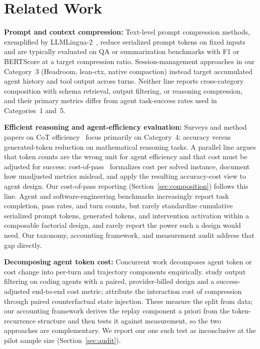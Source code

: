 \documentclass{article}
\begin{document}
\section{Related Work}
\label{sec:related}

\textbf{Prompt and context compression:} Text-level prompt compression methods, exemplified by LLMLingua-2~\citep{llmlingua2}, reduce serialized prompt tokens on fixed inputs and are typically evaluated on QA or summarization benchmarks with F1 or BERTScore at a target compression ratio. Session-management approaches in our Category~3 (Headroom, lean-ctx, native compaction) instead target accumulated agent history and tool output across turns. Neither line reports cross-category composition with schema retrieval, output filtering, or reasoning compression, and their primary metrics differ from agent task-success rates used in Categories~1 and~5.

\textbf{Efficient reasoning and agent-efficiency evaluation:} Surveys and method papers on CoT efficiency~\citep{sui2025survey, tokenskip2025, chainofdraft2025, ctrlcot2026, extracot2026, seer2025} focus primarily on Category~4: accuracy versus generated-token reduction on mathematical reasoning tasks. A parallel line argues that token counts are the wrong unit for agent efficiency and that cost must be adjusted for success: cost-of-pass~\citep{costofpass2025} formalizes cost per solved instance, \citet{aiagentsmatter2024} document how unadjusted metrics mislead, and \citet{efficientagents2025} apply the resulting accuracy-cost view to agent design. Our cost-of-pass reporting (Section~\ref{sec:composition}) follows this line. Agent and software-engineering benchmarks increasingly report task completion, pass rates, and turn counts, but rarely standardize cumulative serialized prompt tokens, generated tokens, and intervention activation within a composable factorial design, and rarely report the power such a design would need. Our taxonomy, accounting framework, and measurement audit address that gap directly.

\textbf{Decomposing agent token cost:} Concurrent work decomposes agent token or cost change into per-turn and trajectory components empirically. \citet{tokennotcost2026} study output filtering on coding agents with a paired, provider-billed design and a success-adjusted end-to-end cost metric; \citet{compressioncost2026} attribute the interaction cost of compression through paired counterfactual state injection. These measure the split from data; our accounting framework derives the replay component a priori from the token-recurrence structure and then tests it against measurement, so the two approaches are complementary. We report our one such test as inconclusive at the pilot sample size (Section~\ref{sec:audit}).
\end{document}
